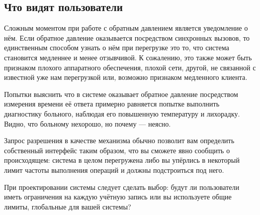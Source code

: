 \documentclass[11pt, oneside]{book}   	%
\begin{document}
\subsection{Что видят пользователи}

Сложным моментом при работе с обратным давлением является уведомление о нём. Если обратное давление оказывается посредством синхронных вызовов, то единственным способом узнать о нём при перегрузке это то, что система становится медленнее и менее отзывчивой. К сожалению, это также может быть признаком плохого аппаратного обеспечения, плохой сети, другой, не связанной с известной уже нам перегрузкой или, возможно признаком медленного клиента.

Попытки выяснить что в системе оказывает обратное давление посредством измерения времени её ответа примерно равняется попытке выполнить диагностику больного, наблюдая его повышенную температуру и лихорадку. Видно, что больному нехорошо, но почему --- неясно.

Запрос разрешения в качестве механизма обычно позволит вам определить собственный интерфейс таким образом, что вы сможете явно сообщить о происходящем: система в целом перегружена либо вы упёрлись в некоторый лимит частоты выполнения операций и должны подстроиться под него.

При проектировании системы следует сделать выбор: будут ли пользователи иметь ограничения на каждую учётную запись или вы используете общие лимиты, глобальные для вашей системы?
\end{document}
